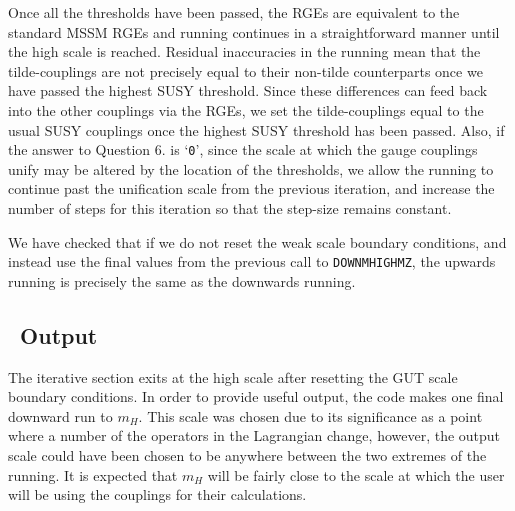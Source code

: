 Once all the thresholds have been passed, the RGEs are equivalent to the
standard MSSM RGEs and running continues in a straightforward manner
until the high scale is reached. Residual inaccuracies in the running
mean that the tilde-couplings are not precisely equal to their non-tilde
counterparts once we have passed the highest SUSY threshold. Since these
differences can feed back into the other couplings via the RGEs, we set
the tilde-couplings equal to the usual SUSY couplings once the highest
SUSY threshold has been passed. Also, if the answer to Question 6. is
`\verb+0+', since the scale at which the gauge couplings unify may be
altered by the location of the thresholds, we allow the running to
continue past the unification scale from the previous iteration, and
increase the number of steps for this iteration so that the step-size
remains constant.

We have checked that if we do not reset the weak scale boundary
conditions, and instead use the final values from the previous call to
\texttt{DOWNMHIGHMZ}, the upwards running is precisely the same as the
downwards running.

\subsection{\progrge~Output}

The iterative section exits at the high scale after resetting the GUT
scale boundary conditions. In order to provide useful output, the code
makes one final downward run to $m_{H}$. This scale was chosen due to
its significance as a point where a number of the operators in the
Lagrangian change, however, the output scale could have been chosen to
be anywhere between the two extremes of the running. It is expected that
$m_{H}$ will be fairly close to the scale at which the user will be
using the couplings for their calculations.

